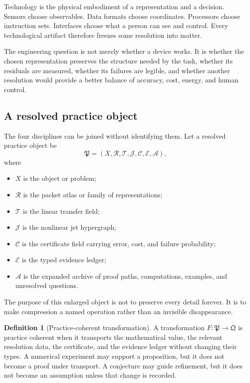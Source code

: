 \documentclass[11pt]{article}
\theoremstyle{definition}
\newtheorem{definition}[theorem]{Definition}
\theoremstyle{remark}
\begin{document}
Technology is the physical embodiment of a representation and a decision.  Sensors choose observables.  Data formats choose coordinates.  Processors choose instruction sets.  Interfaces choose what a person can see and control.  Every technological artifact therefore freezes some resolution into matter.

The engineering question is not merely whether a device works.  It is whether the chosen representation preserves the structure needed by the task, whether its residuals are measured, whether its failures are legible, and whether another resolution would provide a better balance of accuracy, cost, energy, and human control.

\subsection{A resolved practice object}

The four disciplines can be joined without identifying them.  Let a resolved practice object be
\[
\mathfrak P
=
(X,\mathcal R,\mathcal T,\mathcal J,\mathcal C,\mathcal E,\mathcal A),
\]
where
\begin{itemize}
\item $X$ is the object or problem;
\item $\mathcal R$ is the packet atlas or family of representations;
\item $\mathcal T$ is the linear transfer field;
\item $\mathcal J$ is the nonlinear jet hypergraph;
\item $\mathcal C$ is the certificate field carrying error, cost, and failure probability;
\item $\mathcal E$ is the typed evidence ledger;
\item $\mathcal A$ is the expanded archive of proof paths, computations, examples, and unresolved questions.
\end{itemize}
The purpose of this enlarged object is not to preserve every detail forever.  It is to make compression a named operation rather than an invisible disappearance.

\begin{definition}[Practice-coherent transformation]
A transformation $F:\mathfrak P\to\mathfrak Q$ is practice coherent when it transports the mathematical value, the relevant resolution data, the certificate, and the evidence ledger without changing their types.  A numerical experiment may support a proposition, but it does not become a proof under transport.  A conjecture may guide refinement, but it does not become an assumption unless that change is recorded.
\end{definition}
\end{document}
